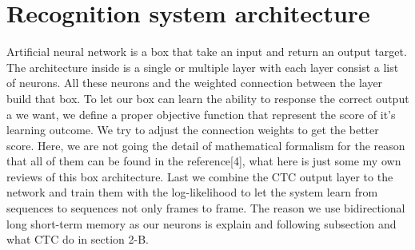 \documentclass[conference]{IEEEtran}
\begin{document}
%





\section{Recognition system architecture}
Artificial neural network is a box that take an input and return an output target.  The architecture inside is a single or multiple layer with each layer consist a list of neurons.  All these neurons and the weighted connection between the layer build that box.  To let our box can learn the ability to response the correct output a we want, we define a proper objective function that represent the score of it's learning outcome.  We try to adjust the connection weights to get the better score.  Here, we are not going the detail of mathematical formalism for the reason that all of them can be found in the reference[4], what here is just some my own reviews of this box architecture.  Last we combine the CTC output layer to the network and train them with the log-likelihood to let the system learn from sequences to sequences not only frames to frame.  The reason we use bidirectional long short-term memory as our neurons is explain and following subsection and what CTC do in section 2-B.  
\end{document}
